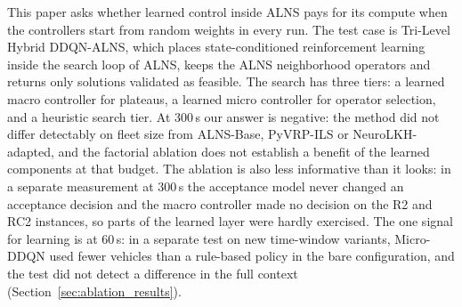 \documentclass{ieeeaccess}
\begin{document}
This paper asks whether learned control inside ALNS pays for its compute when the controllers start from random weights in every run. The test case is Tri-Level Hybrid DDQN-ALNS, which places state-conditioned reinforcement learning inside the search loop of ALNS, keeps the ALNS neighborhood operators and returns only solutions validated as feasible. The search has three tiers: a learned macro controller for plateaus, a learned micro controller for operator selection, and a heuristic search tier. At 300\,s our answer is negative: the method did not differ detectably on fleet size from ALNS-Base, PyVRP-ILS or NeuroLKH-adapted, and the factorial ablation does not establish a benefit of the learned components at that budget. The ablation is also less informative than it looks: in a separate measurement at 300\,s the acceptance model never changed an acceptance decision and the macro controller made no decision on the R2 and RC2 instances, so parts of the learned layer were hardly exercised. The one signal for learning is at 60\,s: in a separate test on new time-window variants, Micro-DDQN used fewer vehicles than a rule-based policy in the bare configuration, and the test did not detect a difference in the full context (Section~\ref{sec:ablation_results}).
\end{document}
